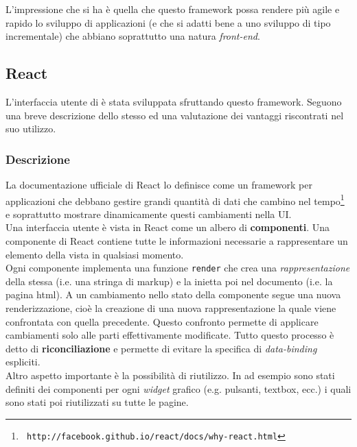 L'impressione che si ha è quella che questo framework possa rendere più agile e rapido
lo sviluppo di applicazioni (e che si adatti bene a uno sviluppo di tipo incrementale)
che abbiano soprattutto una natura \textit{front-end}.

\subsection{React}\label{react}

L'interfaccia utente di \fiscoloMobile{} è stata sviluppata sfruttando
questo framework. Seguono una breve descrizione dello stesso ed una valutazione
dei vantaggi riscontrati nel suo utilizzo.

\subsubsection{Descrizione}\label{descrizione-react}
La documentazione ufficiale di React lo definisce come un framework per applicazioni
che debbano gestire grandi quantità di dati che cambino nel tempo\footnote{\texttt{ http://facebook.github.io/react/docs/why-react.html}} e soprattutto
mostrare dinamicamente questi cambiamenti nella UI. \\

Una interfaccia utente è vista in React come un albero di \textbf{componenti}.
Una componente di React contiene tutte le informazioni necessarie a rappresentare
un elemento della vista in qualsiasi momento. \\

Ogni componente implementa una funzione \texttt{render} che crea una
\textit{rappresentazione} della stessa (i.e. una stringa di markup) e la inietta
poi nel documento (i.e. la pagina html). A un cambiamento nello stato della componente
segue una nuova renderizzazione, cioè la creazione di una nuova rappresentazione la quale
viene confrontata con quella precedente. Questo confronto permette di applicare
cambiamenti solo alle parti effettivamente modificate. Tutto questo processo è detto
di \textbf{riconciliazione} e permette di evitare la specifica di
\textit{data-binding} espliciti. \\

Altro aspetto importante è la possibilità di riutilizzo. In \fiscoloMobile{} 
ad esempio sono stati definiti dei componenti per ogni \textit{widget} grafico (e.g.
pulsanti, textbox, ecc.) i quali sono stati poi riutilizzati su tutte le pagine. \\

